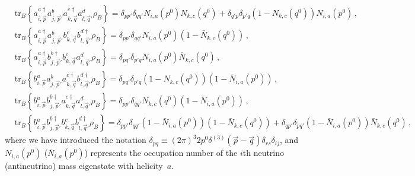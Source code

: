 \documentclass[aps,prd,10pt,twocolumn,superscriptaddress,floatfix,nofootinbib,amsmath,amssymb,altaffilletter,preprintnumbers]{revtex4-1}
\begin{document}
\begin{equation}
\begin{aligned}
 & \text{tr}_B\left\{ 
        a^{a \dag}_{i,\vec{p}} a^b_{j,\vec{p}'} 
        a^{c \dag}_{k,\vec{q}} a^{d}_{l,\vec{q}'} \rho_B 
    \right\}=\delta_{pp'}\delta_{qq'}N_{i,a}(p^0)N_{k,c}(q^0)+\delta_{q'p}\delta_{p'q}(1-N_{k,c}(q^0))N_{i,a}(p^0)\,, \\
    & \text{tr}_B\left\{ 
        a^{a \dag}_{i,\vec{p}} a^b_{j,\vec{p}'} 
    b^{c}_{k,\vec{q}} b^{d  \dag}_{l,\vec{q}'} \rho_B 
    \right\}=\delta_{pp'}\delta_{qq'}N_{i,a}(p^0)(1-\bar{N}_{k,c}(q^0))\, , \\
    &\text{tr}_B\left\{ 
        a^{a \dag}_{i,\vec{p}} b^{b \dag}_{j,\vec{p}'}
    b^{c}_{k,\vec{q}} a^{d }_{l,\vec{q}'} \rho_B 
    \right\}=\delta_{pq'}\delta_{p'q}N_{i,a}(p^0)\bar{N}_{k,c}(q^0)\,, \\
    &  \text{tr}_B\left\{ 
        b^{a}_{i,\vec{p}} a^{b }_{j,\vec{p}'} 
    a^{c \dag}_{k,\vec{q}} b^{d \dag}_{l,\vec{q}'} \rho_B 
    \right\}=\delta_{pq'}\delta_{p'q}(1-N_{k,c}(q^0))(1-\bar{N}_{i,a}(p^0))\,, \\
    &\text{tr}_B\left\{ 
        b^{a}_{i,\vec{p}} b^{b \dag }_{j,\vec{p}'} 
    a^{c \dag}_{k,\vec{q}} a^{d }_{l,\vec{q}'} \rho_B 
    \right\}=\delta_{pp'}\delta_{qq'}N_{k,c}(q^0)(1-\bar{N}_{i,a}(p^0))\, , \\
    & \text{tr}_B\left\{ 
        b^{a}_{i,\vec{p}} b^{b \dag }_{j,\vec{p}'} 
    b^{c}_{k,\vec{q}} b^{d \dag }_{l,\vec{q}'} \rho_B 
    \right\}=\delta_{pp'}\delta_{qq'}(1-\bar{N}_{i,a}(p^0))(1-\bar{N}_{k,c}(q^0))+\delta_{qp'}\delta_{pq'}(1-\bar{N}_{i,a}(p^0))\bar{N}_{k,c}(q^0)\,,
\end{aligned}
\end{equation}
where we have introduced the notation $\delta_{pq} \equiv (2\pi)^3 2p^0\delta^{(3)}(\vec{p}-\vec{q})\delta_{rs}\delta_{ij}$, and $N_{i,a}(p^0)$ ($\bar{N}_{i,a}(p^0)$) represents the occupation number of the $i$th neutrino (antineutrino) mass eigenstate with helicity~$a$.  
\end{document}
